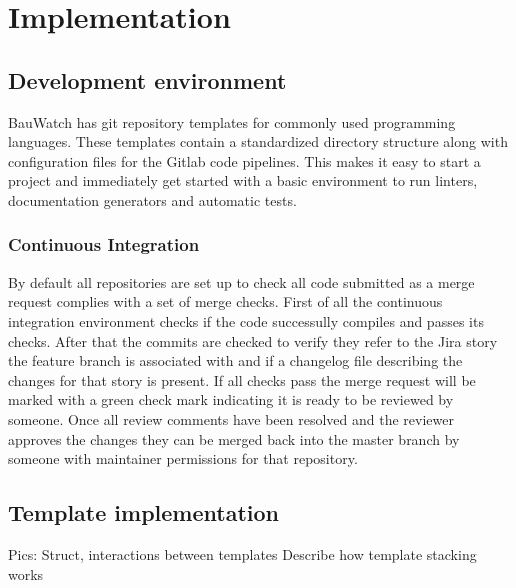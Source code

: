 \chapter{Implementation}
\section{Development environment}
BauWatch has git repository templates for commonly used programming languages.
These templates contain a standardized directory structure along with configuration files for the Gitlab code pipelines.
This makes it easy to start a project and immediately get started with a basic environment to run linters, documentation generators and automatic tests.

\subsection{Continuous Integration}
By default all repositories are set up to check all code submitted as a merge request complies with a set of merge checks.
First of all the continuous integration environment checks if the code successully compiles and passes its checks.
After that the commits are checked to verify they refer to the Jira story the feature branch is associated with and if a changelog file describing the changes for that story is present.
If all checks pass the merge request will be marked with a green check mark indicating it is ready to be reviewed by someone.
Once all review comments have been resolved and the reviewer approves the changes they can be merged back into the master branch by someone with maintainer permissions for that repository.




\section{Template implementation}
Pics:
Struct, interactions between templates
Describe how template stacking works

